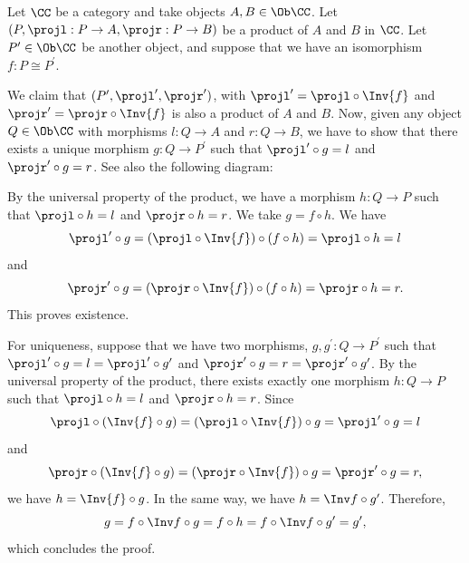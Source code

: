 \begin{solution}\label{sol:product_preserved_by_iso}
	Let $ \CC $ be a category and take objects $ A, B \in \Ob\CC $. Let $ (P, \projl: P \to A, \projr: P \to B) $ be a product of $ A $ and $ B $ in $ \CC $. Let $ P^\prime \in \Ob\CC $ be another object, and suppose that we have an isomorphism $ f: P \cong P^\prime $.

	We claim that $ (P^\prime, \projl^\prime, \projr^\prime) $, with $ \projl^\prime = \projl \circ \Inv{f} $ and $ \projr^\prime = \projr \circ \Inv{f} $ is also a product of $ A $ and $ B $. Now, given any object $ Q \in \Ob\CC $ with morphisms $ l: Q \to A $ and $ r: Q \to B $, we have to show that there exists a unique morphism $ g: Q \to P^\prime $ such that $ \projl^\prime \circ g = l $ and $ \projr^\prime \circ g = r $. See also the following diagram:

	\begin{center}
	\end{center}
	
	By the universal property of the product, we have a morphism $ h: Q \to P $ such that $ \projl \circ h = l $ and $ \projr \circ h = r $. We take $ g = f \circ h $. We have 
	\[ \projl^\prime \circ g = (\projl \circ \Inv{f}) \circ (f \circ h) = \projl \circ h = l  \]
	and
	\[ \projr^\prime \circ g = (\projr \circ \Inv{f}) \circ (f \circ h) = \projr \circ h = r.  \]
	This proves existence.

	For uniqueness, suppose that we have two morphisms, $ g, g^\prime: Q \to P^\prime $ such that $ \projl^\prime \circ g = l = \projl^\prime \circ g^\prime $ and $ \projr^\prime \circ g = r = \projr^\prime \circ g^\prime $. By the universal property of the product, there exists exactly one morphism $ h: Q \to P $ such that $ \projl \circ h = l $ and $ \projr \circ h = r $. Since
	\[ \projl \circ (\Inv{f} \circ g) = (\projl \circ \Inv{f}) \circ g = \projl^\prime \circ g = l \]
	and
	\[ \projr \circ (\Inv{f} \circ g) = (\projr \circ \Inv{f}) \circ g = \projr^\prime \circ g = r, \]
	we have $ h = \Inv{f} \circ g $. In the same way, we have $ h = \Inv f \circ g^\prime $. Therefore,
	\[ g = f \circ \Inv f \circ g = f \circ h = f \circ \Inv f \circ g^\prime = g^\prime, \]
	which concludes the proof.
\end{solution}

